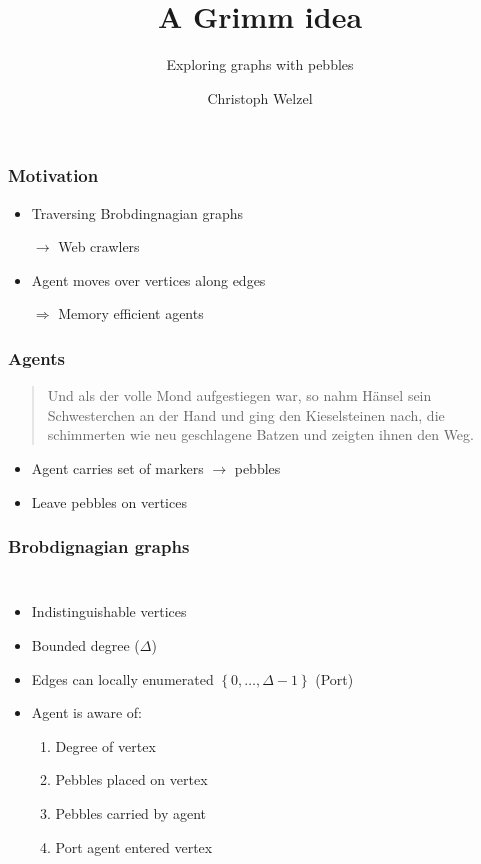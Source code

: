 \documentclass{beamer}
\title{A Grimm idea}
\subtitle{Exploring graphs with pebbles}
\author{Christoph Welzel}
\institute{Logik und Theorie diskreter Systeme, RWTH Aachen}
\begin{document}
\maketitle
\begin{frame}
  \frametitle{Motivation}
  \begin{itemize}
    \item Traversing Brobdingnagian graphs
    \item[$\rightarrow$] Web crawlers
    \item Agent moves over vertices along edges
    \item[$\Rightarrow$] Memory efficient agents
  \end{itemize}
\end{frame}

\begin{frame}
  \frametitle{Agents}
  \begin{quotation}
    Und als der volle Mond aufgestiegen war, so nahm Hänsel sein
    Schwesterchen an der Hand und ging den Kieselsteinen nach, die schimmerten
    wie neu geschlagene Batzen und zeigten ihnen den Weg.
  \end{quotation}
  \vspace{-0.5cm}
  \vspace{-0.5cm}
  \begin{itemize}
    \item Agent carries set of markers $\rightarrow$ pebbles
    \item Leave pebbles on vertices
  \end{itemize}
\end{frame}

\begin{frame}
  \frametitle{Brobdignagian graphs}
  \begin{columns}
    \begin{itemize}
      \item Indistinguishable vertices
      \item Bounded degree ($\Delta$)
      \item Edges can locally enumerated $\left\{0,\dots,\Delta-1\right\}$
        (Port)
      \item Agent is aware of:
        \begin{enumerate}
          \item Degree  of vertex
          \item Pebbles placed on vertex
          \item Pebbles carried by agent
          \item Port    agent entered vertex
        \end{enumerate}
    \end{itemize}
    \begin{center}
      \resizebox{\textwidth}{!}{}
    \end{center}
  \end{columns}
\end{frame}
\end{document}
